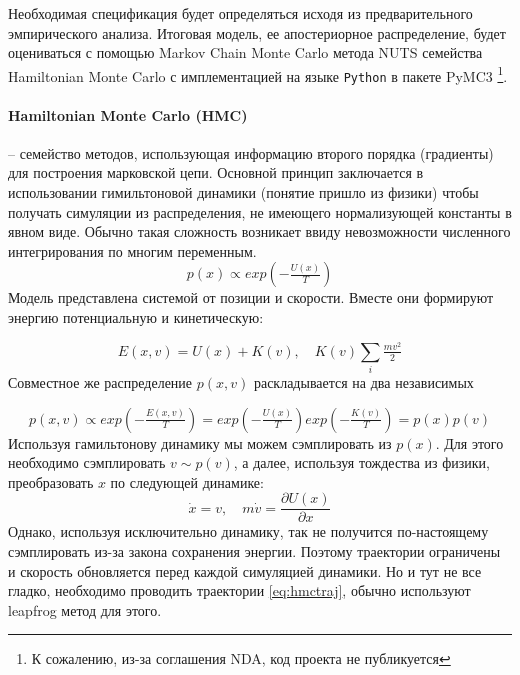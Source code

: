 Необходимая спецификация будет определяться исходя из предварительного эмпирического анализа. Итоговая модель, ее апостериорное распределение, будет оцениваться с помощью Markov Chain Monte Carlo метода NUTS \citep{hoffman2011nuts} семейства Hamiltonian Monte Carlo с имплементацией на языке \texttt{Python} в пакете PyMC3 \citep{salvatier2016pymc3}\footnote{К сожалению, из-за соглашения NDA, код проекта не публикуется}.

\paragraph{Hamiltonian Monte Carlo (HMC)} -- семейство методов, использующая информацию второго порядка (градиенты) для построения марковской цепи. Основной принцип заключается в использовании гимильтоновой динамики (понятие пришло из физики) чтобы получать симуляции из распределения, не имеющего нормализующей константы в явном виде. Обычно такая сложность возникает ввиду невозможности численного интегрирования по многим переменным.
\begin{equation}
p(x) \propto exp(-\tfrac{U(x)}{T})
\end{equation}
Модель представлена системой от позиции и скорости. Вместе они формируют энергию потенциальную и кинетическую:

\begin{equation}
E(x, v) = U(x) + K(v),\quad K(v)\sum_{i}\tfrac{mv^2}{2}
\end{equation}
Совместное же распределение $p(x, v)$ раскладывается на два независимых

\begin{equation}
p(x, v) \propto exp(-\tfrac{E(x, v)}{T}) = exp(-\tfrac{U(x)}{T})exp(-\tfrac{K(v)}{T})=p(x)p(v)
\end{equation}
Используя гамильтонову динамику мы можем сэмплировать из $p(x)$. Для этого необходимо сэмплировать $v \sim p(v)$, а далее, используя тождества из физики, преобразовать $x$ по следующей динамике:
\begin{equation}
\dot{x} = v,\quad m\dot{v} = \frac{\partial U(x)}{\partial x} \label{eq:hmctraj}
\end{equation}
Однако, используя исключительно динамику, так не получится по-настоящему сэмплировать из-за закона сохранения энергии. Поэтому траектории ограничены и скорость обновляется перед каждой симуляцией динамики. Но и тут не все гладко, необходимо проводить траектории \eqref{eq:hmctraj}, обычно используют leapfrog метод для этого.


